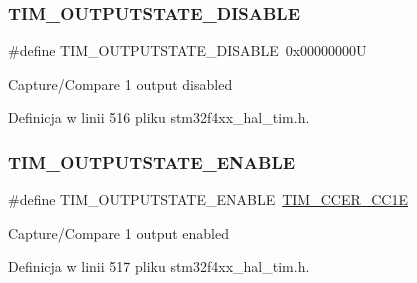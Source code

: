 \subsubsection{\texorpdfstring{T\+I\+M\+\_\+\+O\+U\+T\+P\+U\+T\+S\+T\+A\+T\+E\+\_\+\+D\+I\+S\+A\+B\+LE}{TIM\_OUTPUTSTATE\_DISABLE}}
{\footnotesize\ttfamily \#define T\+I\+M\+\_\+\+O\+U\+T\+P\+U\+T\+S\+T\+A\+T\+E\+\_\+\+D\+I\+S\+A\+B\+LE~0x00000000U}

Capture/\+Compare 1 output disabled 

Definicja w linii 516 pliku stm32f4xx\+\_\+hal\+\_\+tim.\+h.

\mbox{\label{group___t_i_m___output___compare___state_ga114555abc521311f689478a7e0a9ace9}} 
\subsubsection{\texorpdfstring{T\+I\+M\+\_\+\+O\+U\+T\+P\+U\+T\+S\+T\+A\+T\+E\+\_\+\+E\+N\+A\+B\+LE}{TIM\_OUTPUTSTATE\_ENABLE}}
{\footnotesize\ttfamily \#define T\+I\+M\+\_\+\+O\+U\+T\+P\+U\+T\+S\+T\+A\+T\+E\+\_\+\+E\+N\+A\+B\+LE~\hyperlink{group___peripheral___registers___bits___definition_ga3f494b9881e7b97bb2d79f7ad4e79937}{T\+I\+M\+\_\+\+C\+C\+E\+R\+\_\+\+C\+C1E}}

Capture/\+Compare 1 output enabled 

Definicja w linii 517 pliku stm32f4xx\+\_\+hal\+\_\+tim.\+h.

